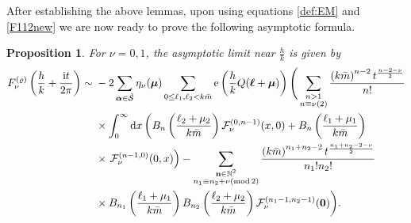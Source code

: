 \documentclass[10pt,a4paper]{amsart}
\def\CF{\mathcal{F}}
\def\ss{ \tilde{\mathcal{S}} }
\def\bos{\varrho}
\def\bal{\boldsymbol{\alpha}}
\def\bmu{\boldsymbol{\mu}}
\def\bol{\boldsymbol{\ell}}
\def\ex{{\rm e}}
\def\tmod{\mathrm{mod}}
\newtheorem{prop}[thm]{Proposition}
\theoremstyle{definition}
\numberwithin{equation}{section}
\begin{document}
After establishing the above lemmas, upon using equations \eqref{def:EM} and \eqref{F112new} we are now ready to prove the following asymptotic formula.


\begin{prop}\label{prop:Fs12asymptotics}
	For $\nu=0,1$, the asymptotic limit
 near $\tfrac{h}{k}$ is given by
	\begin{align}
				F_\nu^{(\bos)}\left(\frac{h}{k} +\frac{{\rm i}t}{2\pi}\right) \sim{}&-2
			\sum_{\bal\in\ss} \eta_\nu{(\bmu)}
			\sum_{ 0\leq \ell_1,\ell_2 < k\bar m } \ex\left(\frac{h}{k}Q(\bol+\bmu)\right) \Bigg(
			\sum_{\substack{ n> 1\\n\equiv \nu (2)} }
			\frac{ \left( k\bar{m} \right)^{n-2} t^{\frac{n-2-\nu}{2}} }{n!}\nonumber\\
			&\times\int_0^\infty {\rm d}x \left( B_{n}\left(\frac{\ell_2+\mu_2}{k\bar{m}}\right) \CF_\nu^{(0,n-1)} (x,0) +B_{n}\left(\frac{\ell_1+\mu_1}{k\bar{m}}\right)\right.\nonumber
			\\
			&\times\left.\CF_\nu^{(n-1,0)} (0,x) \right) -
			\sum_{ \substack{ \mathbf{n}\in\mathbb{N}^2 \\ n_1 \equiv n_2 +\nu (\tmod\, 2) }}
			\frac{\left( k\bar{m}\right)^{n_1+n_2-2} t^{\frac{n_1+n_2-2-\nu}{2}} }{n_1! n_2!}\nonumber\\
&\times B_{n_1}\left(\frac{\ell_1+\mu_1}{k\bar{m}}\right)B_{n_2}\left(\frac{\ell_2+\mu_2}{k\bar{m}}\right)\CF_\nu^{(n_1-1,n_2-1)} (\boldsymbol{0}) \bigg) .\label{def:F11new-2}
\end{align}
\end{prop}
\end{document}
